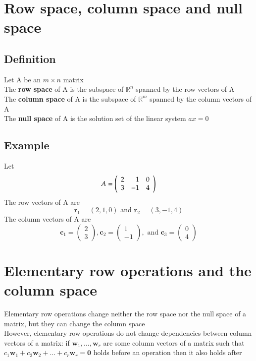 \documentclass{article}[18pt]
\begin{document}
\section{Row space, column space and null space}
\subsection{Definition}
Let A be an $m\times n$ matrix\\
The \textbf{row space} of A is the subspace of $\mathbb{ R }^n$ spanned by the row vectors of A\\
The \textbf{column space} of A is the subspace of $\mathbb{ R }^m$ spanned by the column vectors of A\\
The \textbf{null space} of A is the solution set of the linear system $ax=0$
\subsection{Example}
Let
$$A = \left( \begin{array} { r r r } { 2 } & { 1 } & { 0 } \\ { 3 } & { - 1 } & { 4 } \end{array} \right)$$
The row vectors of A are
$$\mathbf { r } _ { 1 } = ( 2,1,0 ) \text { and } \mathbf { r } _ { 2 } = ( 3 , - 1,4 )$$
The column vectors of A are
$$\mathbf { c } _ { 1 } = \left( \begin{array} { c } { 2 } \\ { 3 } \end{array} \right) , \mathbf { c } _ { 2 } = \left( \begin{array} { r } { 1 } \\ { - 1 } \end{array} \right) , \text { and } \mathbf { c } _ { 3 } = \left( \begin{array} { l } { 0 } \\ { 4 } \end{array} \right)$$
\section{Elementary row operations and the column space}
Elementary row operations change neither the row space nor the null space of a matrix, but they can change the column space\\
However, elementary row operations do not change dependencies between column vectors of a matrix: if $\mathbf { w } _ { 1 } , \dots , \mathbf { w } _ { r }$ are some column vectors of a matrix such that $c _ { 1 } \mathbf { w } _ { 1 } + c _ { 2 } \mathbf { w } _ { 2 } + \ldots + c _ { r } \mathbf { w } _ { r } = \mathbf { 0 }$ holds before an operation then it also holds after
\end{document}
